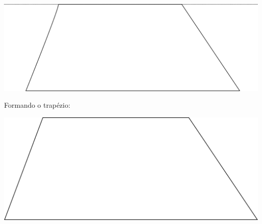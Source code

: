 \documentclass[a4paper,12pt,final]{article}
\begin{document}
\begin{center}
  \includegraphics[scale=.18]{img/passo2}
\end{center}
\vfill

Formando o trapézio:

\begin{center}
  \includegraphics[scale=.25]{img/passo3}
\end{center}
\end{document}
